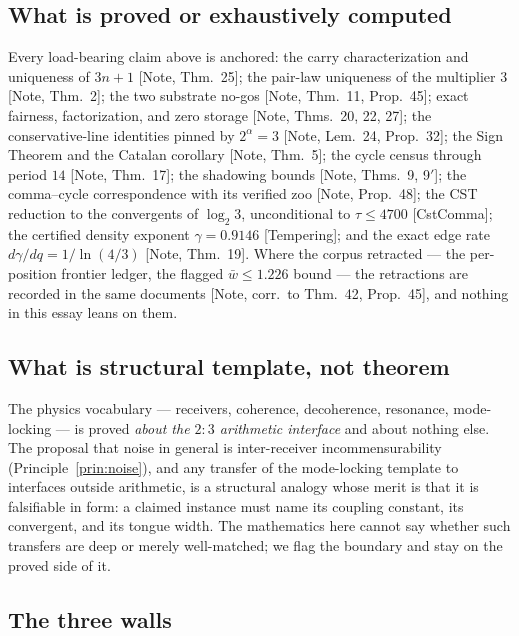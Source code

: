 \documentclass[11pt]{article}
\theoremstyle{definition}
\theoremstyle{remark}
\newcommand{\anchor}[1]{\textup{[#1]}}
\begin{document}
\subsection{What is proved or exhaustively computed}

Every load-bearing claim above is anchored: the carry characterization and
uniqueness of $3n+1$ \anchor{Note, Thm.~25}; the pair-law uniqueness of the
multiplier $3$ \anchor{Note, Thm.~2}; the two substrate no-gos \anchor{Note,
Thm.~11, Prop.~45}; exact fairness, factorization, and zero storage
\anchor{Note, Thms.~20, 22, 27}; the conservative-line identities pinned by
$2^\alpha = 3$ \anchor{Note, Lem.~24, Prop.~32}; the Sign Theorem and the
Catalan corollary \anchor{Note, Thm.~5}; the cycle census through period $14$
\anchor{Note, Thm.~17}; the shadowing bounds \anchor{Note, Thms.~9, 9$'$};
the comma--cycle correspondence with its verified zoo \anchor{Note,
Prop.~48}; the CST reduction to the convergents of $\log_2 3$, unconditional
to $\tau \leq 4700$ \anchor{CstComma}; the certified density exponent
$\gamma = 0.9146$ \anchor{Tempering}; and the exact edge rate
$d\gamma/dq = 1/\ln(4/3)$ \anchor{Note, Thm.~19}. Where the corpus retracted
--- the per-position frontier ledger, the flagged $\bar{w} \leq 1.226$ bound
--- the retractions are recorded in the same documents \anchor{Note,
corr.~to Thm.~42, Prop.~45}, and nothing in this essay leans on them.

\subsection{What is structural template, not theorem}

The physics vocabulary --- receivers, coherence, decoherence, resonance,
mode-locking --- is proved \emph{about the $2{:}3$ arithmetic interface} and
about nothing else. The proposal that noise in general is inter-receiver
incommensurability (Principle~\ref{prin:noise}), and any transfer of the
mode-locking template to interfaces outside arithmetic, is a structural
analogy whose merit is that it is falsifiable in form: a claimed instance
must name its coupling constant, its convergent, and its tongue width. The
mathematics here cannot say whether such transfers are deep or merely
well-matched; we flag the boundary and stay on the proved side of it.

\subsection{The three walls}
\end{document}
